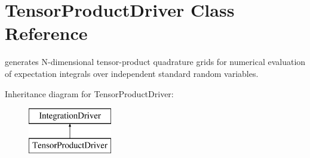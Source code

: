 \section{Tensor\+Product\+Driver Class Reference}
\label{classPecos_1_1TensorProductDriver}


generates N-\/dimensional tensor-\/product quadrature grids for numerical evaluation of expectation integrals over independent standard random variables.  


Inheritance diagram for Tensor\+Product\+Driver\+:\begin{figure}[H]
\begin{center}
\leavevmode
\includegraphics[height=2.000000cm]{classPecos_1_1TensorProductDriver}
\end{center}
\end{figure}
